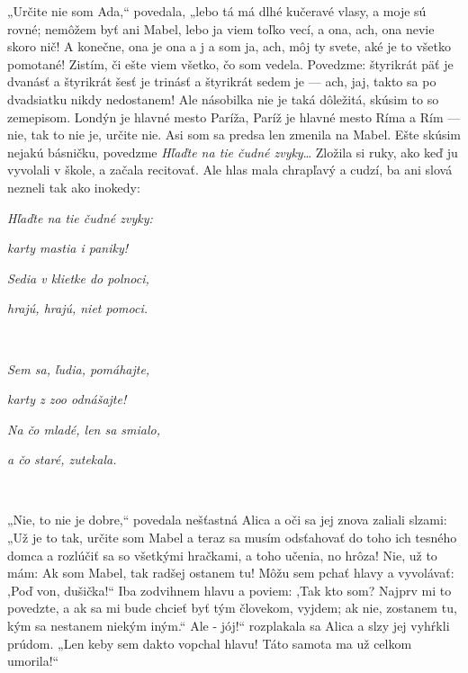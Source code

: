 \documentclass[12pt]{book}
\begin{document}
\begin{Parallel}[p]{}{}
{„Určite nie som Ada,“ povedala, „lebo tá má dlhé kučeravé vlasy, a moje sú rovné; nemôžem byť ani Mabel, lebo ja viem toľko vecí, a ona, ach, ona nevie skoro nič! A konečne, ona je ona a j a som ja, ach, môj ty svete, aké je to všetko pomotané! Zistím, či ešte viem všetko, čo som vedela. Povedzme: štyrikrát päť je dvanásť a štyrikrát šesť je trinásť a štyrikrát sedem je — ach, jaj, takto sa po dvadsiatku nikdy nedostanem! Ale násobilka nie je taká dôležitá, skúsim to so zemepisom. Londýn je hlavné mesto Paríža, Paríž je hlavné mesto Ríma a Rím — nie, tak to nie je, určite nie. Asi som sa predsa len zmenila na Mabel. Ešte skúsim nejakú básničku, povedzme \textit{Hľaďte na tie čudné zvyky}… Zložila si ruky, ako keď ju vyvolali v škole, a začala
recitovať. Ale hlas mala chrapľavý a cudzí, ba ani slová
nezneli tak ako inokedy:\\

\par
{\setlength{\parskip}{0em}
\par\textit{\quad Hľaďte na tie čudné zvyky:}
\par\textit{\quad karty mastia i paniky!}
\par\textit{\quad Sedia v klietke do polnoci,}
\par\textit{\quad hrajú, hrajú, niet pomoci.}
}\\
\par

{\setlength{\parskip}{0em}
\par\textit{\quad Sem sa, ľudia, pomáhajte,}
\par\textit{\quad karty z zoo odnášajte!}
\par\textit{\quad Na čo mladé, len sa smialo,}
\par\textit{\quad a čo staré, zutekala.}
}\\
\par

„Nie, to nie je dobre,“ povedala nešťastná Alica a oči sa
jej znova zaliali slzami: „Už je to tak, určite som Mabel
a teraz sa musím odsťahovať do toho ich tesného domca
a rozlúčiť sa so všetkými hračkami, a toho učenia, no hrôza!
Nie, už to mám: Ak som Mabel, tak radšej ostanem tu!
Môžu sem pchať hlavy a vyvolávať: ,Poď von, dušička!“ Iba
zodvihnem hlavu a poviem: ,Tak kto som? Najprv mi to
povedzte, a ak sa mi bude chcieť byť tým človekom, vyjdem;
ak nie, zostanem tu, kým sa nestanem niekým iným.“ Ale
- jój!“ rozplakala sa Alica a slzy jej vyhŕkli prúdom. „Len
keby sem dakto vopchal hlavu! Táto samota ma už celkom
umorila!“

}
\end{Parallel}
\end{document}
